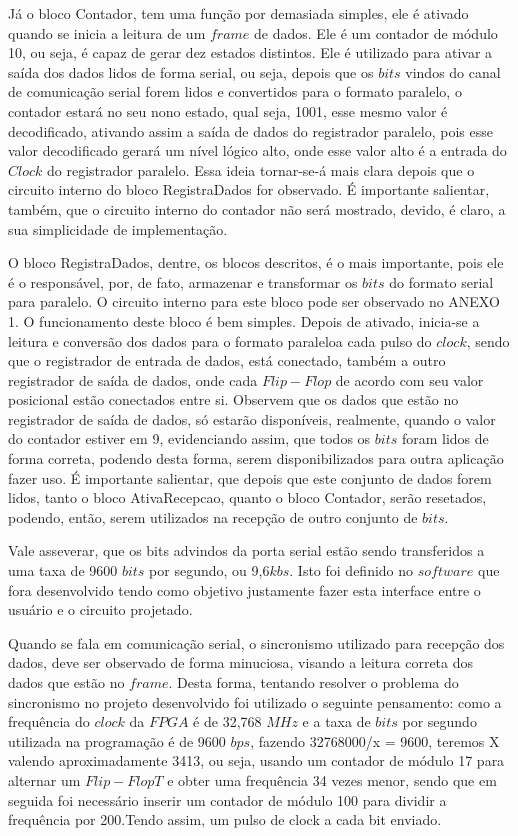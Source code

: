 \documentclass[12pt]{article}
\begin{document}


Já o bloco Contador, tem uma função por demasiada simples, ele é ativado quando se inicia a leitura de um $frame$ de dados. Ele é um contador de módulo 10, ou seja, é capaz de gerar dez estados distintos. Ele é utilizado para ativar a saída dos dados lidos de forma serial, ou seja, depois que os $bits$ vindos do canal de comunicação serial forem lidos e convertidos para o formato paralelo, o contador estará no seu nono estado, qual seja, 1001, esse mesmo valor é decodificado, ativando assim a saída de dados do registrador paralelo, pois esse valor decodificado gerará um nível lógico alto, onde esse valor alto é a entrada do $Clock$ do registrador paralelo. Essa ideia tornar-se-á mais clara depois que o circuito interno do bloco RegistraDados for observado. É importante salientar, também, que o circuito interno do contador não será mostrado, devido, é claro, a sua simplicidade de implementação.

O bloco RegistraDados, dentre, os blocos descritos, é o mais importante, pois ele é o responsável, por, de fato, armazenar e transformar os $bits$ do formato serial para paralelo. O circuito interno para este bloco pode ser observado no ANEXO 1.  O funcionamento deste bloco é bem simples. Depois de ativado, inicia-se a leitura e conversão dos dados para o formato paraleloa cada pulso do $clock$, sendo que o registrador de entrada de dados, está conectado, também a outro registrador de saída de dados, onde cada $Flip-Flop$ de acordo com seu valor posicional estão conectados entre si. Observem que os dados que estão no registrador de saída de dados, só estarão disponíveis, realmente, quando o valor do contador estiver em 9, evidenciando assim, que todos os $bits$ foram lidos de forma correta, podendo desta forma, serem disponibilizados para outra aplicação fazer uso.  É importante salientar, que depois que este conjunto de dados forem lidos, tanto o bloco AtivaRecepcao, quanto o bloco Contador, serão resetados, podendo, então, serem utilizados na recepção de outro conjunto de $bits$.

Vale asseverar, que os bits advindos da porta serial estão sendo transferidos a uma taxa de 9600 $bits$ por segundo, ou 9,6$kbs$. Isto foi definido no $software$ que fora desenvolvido tendo como objetivo justamente fazer esta interface entre o usuário e o circuito projetado.

Quando se fala em comunicação serial, o sincronismo utilizado para recepção dos dados, deve ser observado de forma minuciosa, visando a leitura correta dos dados que estão no $frame$.  Desta forma, tentando resolver o problema do sincronismo no projeto desenvolvido foi utilizado o seguinte pensamento: como a frequência do $clock$ da $FPGA$ é de 32,768 $MHz$ e a taxa de $bits$ por segundo utilizada na programação é de 9600 $bps$, fazendo 32768000/x = 9600, teremos X valendo aproximadamente 3413, ou seja, usando um contador de módulo 17 para alternar um $Flip-Flop T$ e obter uma frequência 34 vezes menor, sendo que em seguida foi necessário inserir um contador de módulo 100 para dividir a frequência por 200.Tendo assim, um pulso de clock a cada bit enviado.
\end{document}
